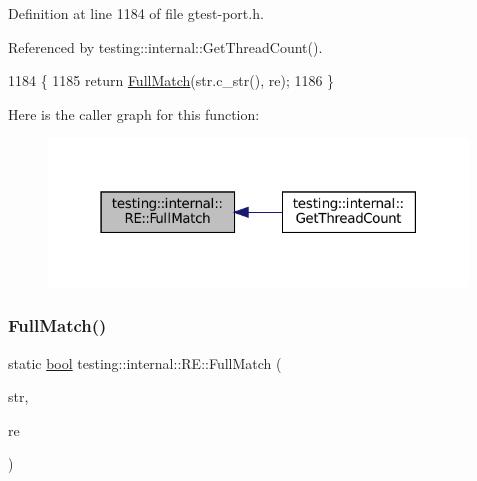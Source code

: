 Definition at line 1184 of file gtest-\/port.\+h.



Referenced by testing\+::internal\+::\+Get\+Thread\+Count().


\begin{DoxyCode}
1184                                                             \{
1185     \textcolor{keywordflow}{return} \hyperlink{classtesting_1_1internal_1_1RE_aa79a950758d0f1d62f7762d1e9cefe86}{FullMatch}(str.c\_str(), re);
1186   \}
\end{DoxyCode}
Here is the caller graph for this function\+:
\nopagebreak
\begin{figure}[H]
\begin{center}
\leavevmode
\includegraphics[width=316pt]{classtesting_1_1internal_1_1RE_aa79a950758d0f1d62f7762d1e9cefe86_icgraph}
\end{center}
\end{figure}
\mbox{\label{classtesting_1_1internal_1_1RE_a2b13ec1f6ccd6c32f7efa01e21588f0b}} 
\subsubsection{\texorpdfstring{Full\+Match()}{FullMatch()}\hspace{0.1cm}{\footnotesize\ttfamily [2/2]}}
{\footnotesize\ttfamily static \hyperlink{classbool}{bool} testing\+::internal\+::\+R\+E\+::\+Full\+Match (\begin{DoxyParamCaption}\item[{const char $\ast$}]{str,  }\item[{const \hyperlink{classtesting_1_1internal_1_1RE}{RE} \&}]{re }\end{DoxyParamCaption})\hspace{0.3cm}{\ttfamily [static]}}

\mbox{\label{classtesting_1_1internal_1_1RE_a6a07573fee776f88fe045d067dbebe18}} 
